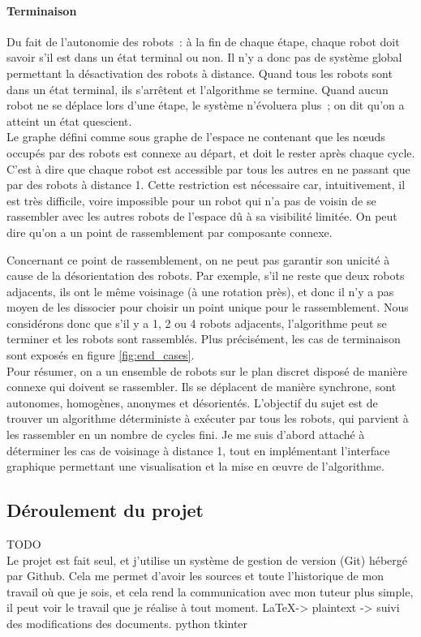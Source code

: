 \paragraph{Terminaison} Du fait de l'autonomie des robots~: à la fin de chaque
étape, chaque robot doit savoir s'il est dans un état terminal ou non. Il n'y a
donc pas de système global permettant la désactivation des robots à distance.
Quand tous les robots sont dans un état terminal, ils s'arrêtent et
l'algorithme se termine. Quand aucun robot ne se déplace lors d'une étape, le
système n'évoluera plus~; on dit qu'on a atteint un état quescient. \\

Le graphe défini comme sous graphe de l'espace ne contenant que les n\oe{}uds
occupés par des robots est connexe au départ, et doit le rester après chaque
cycle. C'est à dire que chaque robot est accessible par tous les autres en ne
passant que par des robots à distance 1. Cette restriction est nécessaire car,
intuitivement, il est très difficile, voire impossible pour un robot qui n'a
pas de voisin de se rassembler avec les autres robots de l'espace dû à sa
visibilité limitée. On peut dire qu'on a un point de rassemblement par
composante connexe.

Concernant ce point de rassemblement, on ne peut pas garantir son unicité à
cause de la désorientation des robots. Par exemple, s'il ne reste que deux
robots adjacents, ils ont le même voisinage (à une rotation près), et donc il
n'y a pas moyen de les dissocier pour choisir un point unique pour le
rassemblement. Nous considérons donc que s'il y a 1, 2 ou 4 robots adjacents,
l'algorithme peut se terminer et les robots sont rassemblés. Plus précisément,
les cas de terminaison sont exposés en figure \ref{fig:end_cases}. \\


Pour résumer, on a un ensemble de robots sur le plan discret disposé de manière
connexe qui doivent se rassembler. Ils se déplacent de manière synchrone, sont
autonomes, homogènes, anonymes et désorientés. L'objectif du sujet est de
trouver un algorithme déterministe à exécuter par tous les robots, qui parvient
à les rassembler en un nombre de cycles fini. Je me suis d'abord attaché à
déterminer les cas de voisinage à distance 1, tout en implémentant l'interface
graphique permettant une visualisation et la mise en \oe{}uvre de l'algorithme.

\subsection{Déroulement du projet}
TODO \\
Le projet est fait seul, et j'utilise un système de gestion de version (Git)
hébergé par Github. Cela me permet d'avoir les sources et toute l'historique de
mon travail où que je sois, et cela rend la communication avec mon tuteur plus
simple, il peut voir le travail que je réalise à tout moment.
\LaTeX -> plaintext -> suivi des modifications des documents.
python tkinter \\
